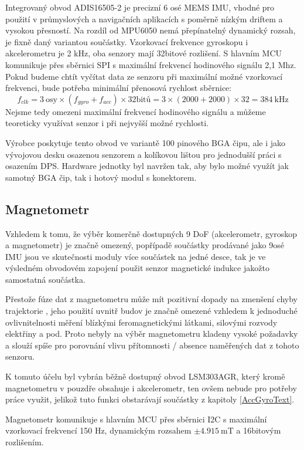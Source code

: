 Integrovaný obvod ADIS16505-2 je precizní 6 osé MEMS IMU, vhodné pro použití v průmyslových a navigačních aplikacích s poměrně nízkým driftem a vysokou přesností. Na rozdíl od MPU6050 nemá přepínatelný dynamický rozsah, je fixně daný variantou součástky. Vzorkovací frekvence gyroskopu i akcelerometru je 2 kHz, oba senzory mají 32bitové rozlišení. S hlavním MCU komunikuje přes sběrnici SPI s maximální frekvencí hodinového signálu 2,1 Mhz. \cite{UZFqHmQU7ZzI3OLB} Pokud budeme chtít vyčítat data ze senzoru při maximální možné vzorkovací frekvenci, bude potřeba minimální přenosová rychlost sběrnice: 
$$ f_{clk}=3~\mathrm{osy} \times(f_{gyro} + f_{acc})\times \mathrm{32bitů}=3\times(2000+2000)\times 32=\SI{384}{\kilo\hertz}$$
Nejsme tedy omezeni maximální frekvencí hodinového signálu a můžeme teoreticky využívat senzor i při nejvyšší možné rychlosti.

Výrobce poskytuje tento obvod ve variantě 100 pinového BGA čipu, ale i jako vývojovou desku osazenou senzorem a kolíkovou lištou pro jednodušší práci s osazením DPS. \cite{UZFqHmQU7ZzI3OLB} Hardware jednotky byl navržen tak, aby bylo možné využít jak samotný BGA čip, tak i hotový modul s konektorem.

\subsection{Magnetometr}
Vzhledem k tomu, že výběr komerčně dostupných 9 DoF (akcelerometr, gyroskop a magnetometr) je značně omezený, popřípadě součástky prodávané jako 9osé IMU jsou ve skutečnosti moduly více součástek na jedné desce, tak je ve výsledném obvodovém zapojení použit senzor magnetické indukce jakožto samostatná součástka. 

Přestože fúze dat z magnetometru může mít pozitivní dopady na zmenšení chyby trajektorie \cite{Tkhorenko2018}, jeho použití uvnitř budov je značně omezené vzhledem k jednoduché ovlivnitelnosti měření blízkými feromagnetickými látkami, silovými rozvody elektřiny a pod. Proto nebyly na výběr magnetometru kladeny vysoké požadavky a slouží spíše pro porovnání vlivu přítomnosti / absence naměřených dat z tohoto senzoru.

K tomuto účelu byl vybrán běžně dostupný obvod LSM303AGR, který kromě magnetometru v pouzdře obsahuje i akcelerometr, ten ovšem nebude pro potřeby práce využit, jelikož tuto funkci obstarávají součástky z kapitoly \ref{AccGyroText}.

Magnetometr komunikuje s hlavním MCU přes sběrnici I2C s maximální vzorkovací frekvencí 150 Hz, dynamickým rozsahem $ \pm \SI{4.915}{\milli\tesla} $ a 16bitovým rozlišením. \cite{RD5DwZcremhT6bgp}

